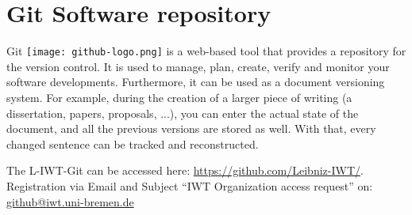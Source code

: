 \section{Git Software repository}

Git \texttt{[image: github-logo.png]} is a web-based tool that provides a repository for the version control. It is used to manage, plan, create, verify and monitor your software developments. Furthermore, it can be used as a document versioning system. For example, during the creation of a larger piece of writing (a dissertation, papers, proposals, ...), you can enter the actual state of the document, and all the previous versions are stored as well. With that, every changed sentence can be tracked and reconstructed.

The L-IWT-Git can be accessed here: \url{https://github.com/Leibniz-IWT/}.
Registration via Email and Subject “IWT Organization access request” on:
\href{mailto:github@iwt.uni-bremen.de}%
{github@iwt.uni-bremen.de}

